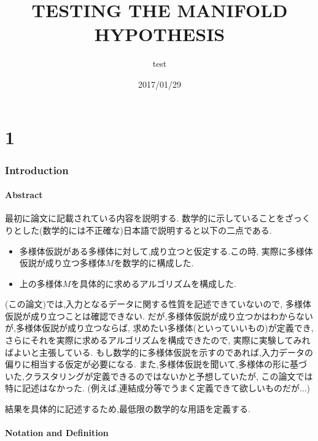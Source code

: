 \documentclass{ujarticle}
\title{TESTING THE MANIFOLD HYPOTHESIS}
\author{test}
\date{2017/01/29}
\begin{document}
\part{1}
\label{part:1}



\section{Introduction}
\label{introduction}


\subsection{Abstract}
\label{sub:Abstract}

最初に論文に記載されている内容を説明する.
数学的に示していることをざっくりとした(数学的には不正確な)日本語で説明すると以下の二点である.
\begin{itemize}
  \item 多様体仮説がある多様体に対して,成り立つと仮定する.この時,
  実際に多様体仮説が成り立つ多様体$M$を数学的に構成した.
  \item 上の多様体$M$を具体的に求めるアルゴリズムを構成した.
\end{itemize}

(この論文)では,入力となるデータに関する性質を記述できていないので,
多様体仮説が成り立つことは確認できない.
だが,多様体仮説が成り立つかはわからないが,多様体仮説が成り立つならば,
求めたい多様体(といっていいもの)が定義でき,さらにそれを実際に求めるアルゴリズムを構成できたので,
実際に実験してみればよいと主張している.
もし数学的に多様体仮説を示すのであれば,入力データの偏りに相当する仮定が必要になる.
また,多様体仮説を聞いて,多様体の形に基づいた,クラスタリングが定義できるのではないかと予想していたが,
この論文では特に記述はなかった.
(例えば,連結成分等でうまく定義できて欲しいものだが...)

結果を具体的に記述するため,最低限の数学的な用語を定義する.
\subsection{Notation and Definition}
\label{sub:Notation and Definition}
\end{document}
